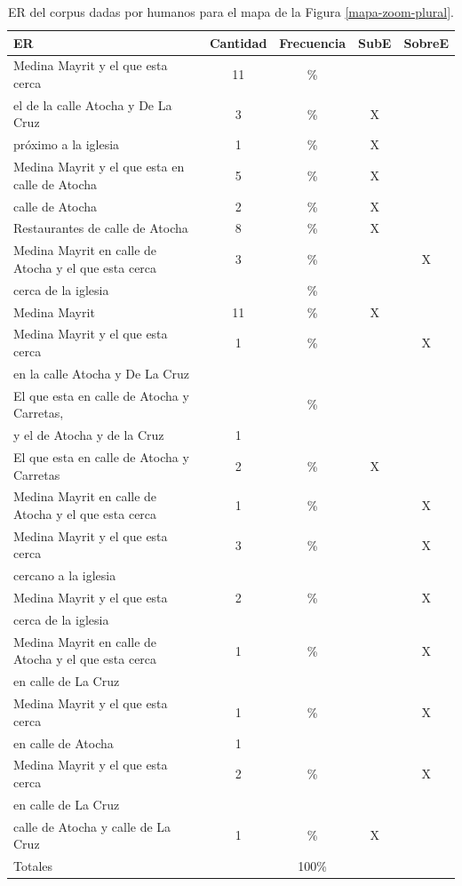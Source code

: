 \begin{table}[H]
{\footnotesize
\begin{center}
\begin{tabular}{|l|c|c|c|c|}
\hline
ER 					      & Cantidad &  Frecuencia & SubE & SobreE\\ \hline \hline
Medina Mayrit y el que esta cerca        &	11	&	\% &  &  \\ \hline
el de la calle Atocha y De La Cruz       &	3  &	\%	&X & \\  \hline
pr\'oximo a la iglesia 	      &1		&	\%	&X &\\ \hline
Medina Mayrit y el que esta en calle de Atocha	      &5		&	\%	&X&\\ \hline
calle de Atocha				&	2  &	\%	&X&\\ \hline
Restaurantes de calle de Atocha				&	8  &	\%	&X&\\ \hline
Medina Mayrit en calle de Atocha y el que esta cerca				& 3  &	\%	&&X\\
cerca de la iglesia				&	  &	\%	&&\\ \hline
Medina Mayrit			&11		&	\%	&X&\\  \hline
Medina Mayrit y el que esta cerca				&	1	&	\%  &&X\\
en la calle Atocha y De La Cruz        &	  &	&&\\ \hline
El que esta en calle de Atocha y Carretas, 	      &		&	\%	&&\\
y el de Atocha y de la Cruz	      &1		&	&&\\ \hline
El que esta en calle de Atocha y Carretas 					&	2  &	\%	&X&\\ \hline
Medina Mayrit en calle de Atocha y el que esta cerca  				&  1 &	\%	&&X\\ \hline
Medina Mayrit y el que esta cerca				&		3 &	\%  & &X\\
cercano a la iglesia				&	  &	&&\\ \hline
Medina Mayrit y el que esta 	&	2	&	\%  &&X\\
cerca de la iglesia				&	  &	&&\\ \hline
Medina Mayrit en calle de Atocha y el que esta cerca			&1  &	\%	&&X\\
en calle de La Cruz	&	  &		&&\\ \hline
Medina Mayrit y el que esta cerca			&1  &	\%	&&X\\
en calle de Atocha	&	1  &		&&\\ \hline
Medina Mayrit y el que esta cerca			&2  &	\%	&&X\\
en calle de La Cruz	&	  &		&&\\ \hline
calle de Atocha y calle de La Cruz  					&1  &	\%	&X&\\
\hline \hline
Totales	&	&	100\%	&&\\

\hline
\end{tabular}
\caption{ER del corpus dadas por humanos para el mapa de la Figura \ref{mapa-zoom-plural}.}\label{freq-mapa-zoom-plural}
\end{center}
}
\end{table}

